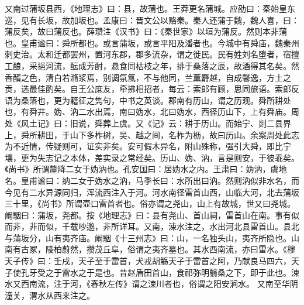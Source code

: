 \documentclass[12pt,UTF8]{ctexbook}
\begin{document}
又南过蒲坂县西，《地理志》曰：县，故蒲也。王莽更名蒲城。应劭曰：秦始皇东巡，见有长坂，故加坂也。孟康曰：晋文公以赂秦。秦人还蒲于魏，魏人喜，曰：蒲反矣，故曰蒲反也。薛瓒注《汉书》曰：《秦世家》以垣为蒲反。然则本非蒲也。皇甫谧曰：舜所都也。或言蒲坂，或言平阳及潘者也。今城中有舜庙，魏秦州刺史治。太和迁都罢州，置河东郡，郡多流杂，谓之徙民。民有姓刘名堕者，宿擅工酿，采挹河流，酝成芳酎，悬食同枯枝之年，排于桑落之辰，故酒得其名矣。然香醑之色，清白若滫浆焉，别调氛氲，不与他同，兰薰麝越，自成馨逸，方土之贡，选最佳酌矣。自王公庶友，牵拂相招者，每云：索郎有顾，思同旅语。索郎反语为桑落也，更为籍征之隽句，中书之英谈。郡南有历山，谓之历观。舜所耕处也，有舜井。妫、汭二水出焉，南曰妫水，北曰妫水，西径历山下，上有舜庙。周处《风土记》曰：旧说，舜葬上虞。又《记》云：耕于历山。而始宁、剡二县界上，舜所耕田，于山下多柞树，吴、越之间，名柞为枥，故曰历山。余案周处此志为不近情，传疑则可，证实非矣。安可假木异名，附山殊称，强引大舜，即比宁壤，更为失志记之本体，差实录之常经矣。历山、妫、汭，言是则安，于彼乖矣。《尚书》所谓釐降二女于妫汭也。孔安国曰：居妫水之内。王肃曰：妫汭，虞地名。皇甫谧曰：纳二女于妫水之汭，马季长曰：水所出曰汭。然则汭似非水名，而今见有二水异源同归，浑流西注入于河。河水南径雷首山西，山临大河，北去蒲坂三十里，《尚书》所谓壶口雷首者也。俗亦谓之尧山，山上有故城，世又曰尧城。阚駰曰：蒲坂，尧都。按《地理志》曰：县有尧山、首山祠，雷首山在南。事有似而非，非而似，千载吵邈，非所详耳。又南，涑水注之，水出河北县雷首山。县北与蒲坂分，山有夷齐庙。阚駰《十三州志》曰：山，一名独头山，夷齐所隐也。山南有古冢，陵柏蔚然，攒茂丘阜，俗谓之夷齐墓也。其水西南流，亦曰雷水。《穆天子传》曰：壬戌，天子至于雷首，犬戎胡觞天子于雷首之阿，乃献良马四六，天子使孔牙受之于雷水之于是也。昔赵盾田首山，食祁弥明翳桑之下，即于此也。涑水又西南流，注于河，《春秋左传》谓之涑川者也，俗谓之阳安涧水。
又南至华阴潼关，渭水从西来注之。
\end{document}

